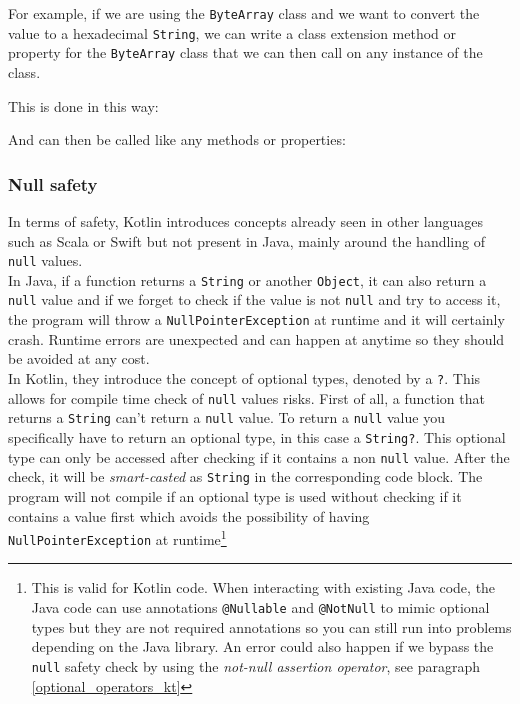 \documentclass[11pt,a4paper]{report}
\begin{document}
For example, if we are using the \verb+ByteArray+ class and we want to convert the value to a hexadecimal \verb+String+, we can write a class extension method or property for the \verb+ByteArray+ class that we can then call on any instance of the class.

This is done in this way:

And can then be called like any methods or properties:

\subsubsection{Null safety}
In terms of safety, Kotlin introduces concepts already seen in other languages such as Scala or Swift but not present in Java, mainly around the handling of \texttt{null} values\cite{kotlin:doc:null}.\\

In Java, if a function returns a \texttt{String} or another \texttt{Object}, it can also return a \texttt{null} value and if we forget to check if the value is not \texttt{null} and try to access it, the program will throw a \texttt{NullPointerException} at runtime and it will certainly crash. Runtime errors are unexpected and can happen at anytime so they should be avoided at any cost. \\

In Kotlin, they introduce the concept of optional types, denoted by a \verb+?+. This allows for compile time check of \texttt{null} values risks. First of all, a function that returns a \texttt{String} can't return a \texttt{null} value. To return a \texttt{null} value you specifically have to return an optional type, in this case a \texttt{String?}. This optional type can only be accessed after checking if it contains a non \texttt{null} value. After the check, it will be \emph{smart-casted} as \texttt{String} in the corresponding code block. The program will not compile if an optional type is used without checking if it contains a value first which avoids the possibility of having \texttt{NullPointerException} at runtime\footnote{This is valid for Kotlin code. When interacting with existing Java code, the Java code can use annotations \texttt{@Nullable} and \texttt{@NotNull} to mimic optional types but they are not required annotations so you can still run into problems depending on the Java library. An error could also happen if we bypass the \texttt{null} safety check by using the \emph{not-null assertion operator}, see paragraph \ref{optional_operators_kt}} \\
\end{document}
